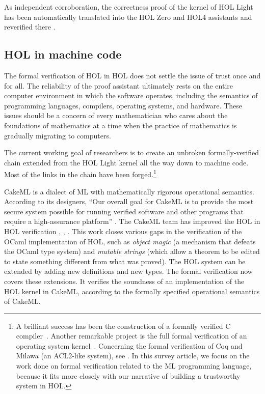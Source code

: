 \documentclass[brochure,english,12pt]{bourbaki}
\theoremstyle{plain}
\begin{document}
As independent corroboration, the correctness proof of the kernel of
HOL Light has been automatically translated into the HOL Zero and HOL4
assistants and reverified there \cite{adams2010introducing}.


\subsection{HOL in machine code}

The formal verification of HOL in HOL does not settle the issue of
trust once and for all.  The reliability of the proof assistant
ultimately rests on the entire computer environment in which the
software operates, including the semantics of programming languages,
compilers, operating systems, and hardware.  These issues should be a
concern of every mathematician who cares about the foundations of
mathematics at a time when the practice of mathematics is gradually
migrating to computers.


The current working goal of researchers is to create an unbroken
formally-verified chain extended from the HOL Light kernel all the way
down to machine code.  Most of the links in the chain have been forged.\footnote{A
  brilliant success has been the construction of a formally verified C
  compiler~\cite{CC}. Another remarkable project is the full formal
  verification of an operating system kernel~\cite{sel4}.  Concerning
  the formal verification of Coq and Milawa (an ACL2-like system), see
  \cite{barras2010sets} \cite{myreen2012reflective}.  In this survey
  article, we focus on the work done on formal verification related to
  the ML programming language, because it fits more closely with our
  narrative of building a trustworthy system in HOL.}

CakeML is a dialect of ML with mathematically rigorous operational
semantics.  According to its designers, ``Our overall goal for CakeML
is to provide the most secure system possible for running verified
software and other programs that require a high-assurance platform''
\cite{CakeML}.  The CakeML team has improved the HOL in HOL
verification \cite{myreen2013steps}, \cite{myreen2013proof},
\cite{kumar2014hol}.  This work closes various gaps in the
verification of the OCaml implementation of HOL, such as {\it object
  magic} (a mechanism that defeats the OCaml type system) and {\it
  mutable strings} (which allow a theorem to be edited to state
something different from what was proved).  The HOL system can be
extended by adding new definitions and new types.  The formal
verification now covers these extensions.  It verifies the soundness
of an implementation of the HOL kernel in CakeML, according to the
formally specified operational semantics of CakeML.
\end{document}
